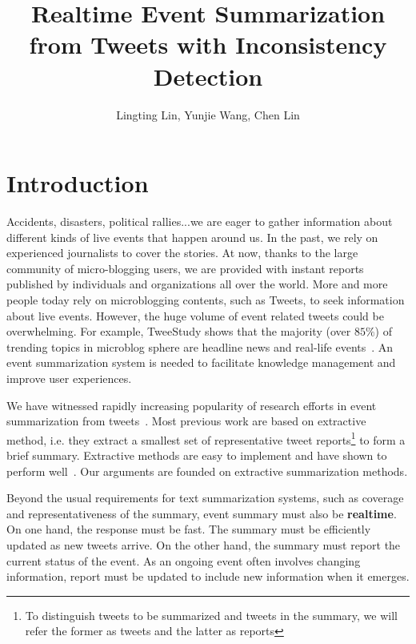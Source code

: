 \documentclass{llncs}
\begin{document}
\title{Realtime Event Summarization from Tweets with Inconsistency Detection}
\author{Lingting Lin, Yunjie Wang, Chen Lin}

\maketitle
\begin{abstract}
\end{abstract}
\section{Introduction}
Accidents, disasters, political rallies...we are eager to gather information about different kinds of live events that happen around us. In the past, we rely on experienced journalists to cover the stories. At now, thanks to the large community of micro-blogging users, we are provided with instant reports published by individuals and organizations all over the world.  More and more people today rely on microblogging contents, such as Tweets, to seek information about live events. However, the huge volume of event related tweets could be overwhelming. For example, TweeStudy shows that the majority (over $85\%$) of trending topics in microblog sphere are headline news and real-life events~\cite{kwak2010twitter}. An event summarization system is needed to facilitate knowledge management and improve user experiences. 

We have witnessed rapidly increasing popularity of research efforts in event summarization from tweets~\cite{}.   Most previous work are based on extractive method, i.e. they extract a smallest set of representative tweet reports\footnote{To distinguish tweets to be summarized and tweets in the summary, we will refer the former as tweets and the latter as reports} to form a brief summary. Extractive methods are easy to implement and have shown to perform well~\cite{}. Our arguments are founded on extractive summarization methods.

Beyond the usual requirements for text summarization systems, such as coverage and representativeness of the summary,  event summary must also be \textbf{realtime}. On one hand, the response must be fast. The summary must be efficiently updated as new tweets arrive. On the other hand, the summary must report the current status of the event. As an ongoing event often involves changing information, report must be updated to include new information when it emerges. 
\end{document}
